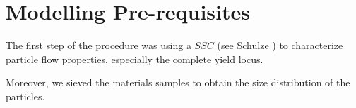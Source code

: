 \section{Modelling Pre-requisites}
\label{sec:modellingprerequisites}


The first step of the procedure was using a $SSC$ (see Schulze
\cite{RefWorks:142}) to characterize particle flow properties, especially the complete yield locus.

Moreover, we sieved the materials samples to obtain the size distribution of the
particles.


\\




